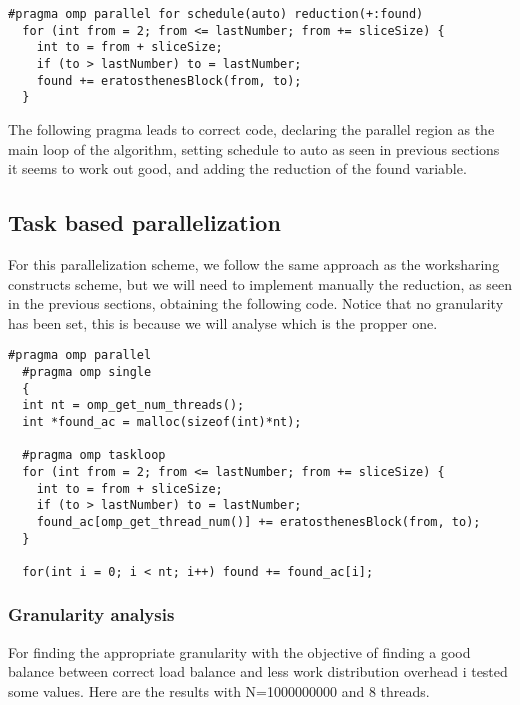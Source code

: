 \begin{lstlisting}[caption={Parallelization scheme using worksharing constructs}, captionpos=b]
  #pragma omp parallel for schedule(auto) reduction(+:found)
  for (int from = 2; from <= lastNumber; from += sliceSize) {
    int to = from + sliceSize;
    if (to > lastNumber) to = lastNumber;
    found += eratosthenesBlock(from, to);
  }
\end{lstlisting}
\justify
The following pragma leads to correct code, declaring the parallel region as the main loop of the algorithm, setting schedule to auto as seen in previous sections it seems to work out good, and adding the reduction of the found variable.

\subsection{Task based parallelization}
For this parallelization scheme, we follow the same approach as the worksharing constructs scheme, but we will need to implement manually the reduction, as seen in the previous sections, obtaining the following code. Notice that no granularity has been set, this is because we will analyse which is the propper one.

\begin{lstlisting}[caption={Parallelization scheme task based using manual reduction}, captionpos=b]
  #pragma omp parallel
  #pragma omp single
  {
  int nt = omp_get_num_threads();
  int *found_ac = malloc(sizeof(int)*nt);

  #pragma omp taskloop
  for (int from = 2; from <= lastNumber; from += sliceSize) {
    int to = from + sliceSize;
    if (to > lastNumber) to = lastNumber;
    found_ac[omp_get_thread_num()] += eratosthenesBlock(from, to);
  }

  for(int i = 0; i < nt; i++) found += found_ac[i];
\end{lstlisting}

\subsubsection*{Granularity analysis}
For finding the appropriate granularity with the objective of finding a good balance between correct load balance and less work distribution overhead i tested some values. Here are the results with N=1000000000 and 8 threads.

